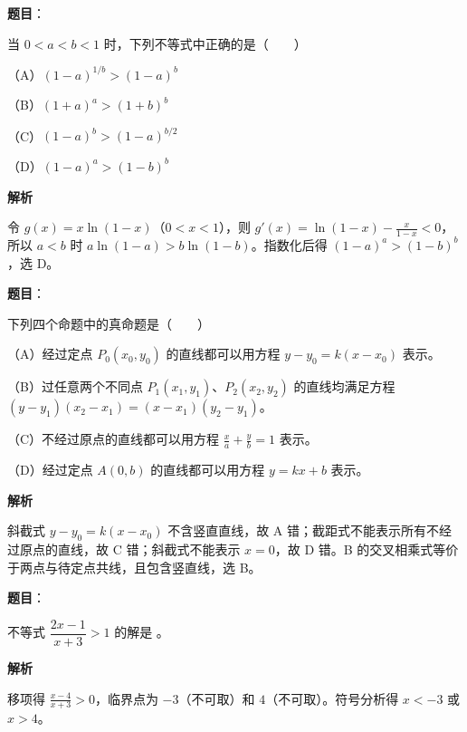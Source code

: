 \begin{answer}

\textbf{题目}：

当 $0<a<b<1$ 时，下列不等式中正确的是\mbox{（　　）}

（A）$(1-a)^{1/b}>(1-a)^b$

（B）$(1+a)^a>(1+b)^b$

（C）$(1-a)^b>(1-a)^{b/2}$

（D）$(1-a)^a>(1-b)^b$

\textbf{解析}

令 $g(x)=x\ln(1-x)$（$0<x<1$），则 $g'(x)=\ln(1-x)-\frac{x}{1-x}<0$，所以 $a<b$ 时 $a\ln(1-a)>b\ln(1-b)$。指数化后得 $(1-a)^a>(1-b)^b$，选 D。


\end{answer}
\begin{answer}

\textbf{题目}：

下列四个命题中的真命题是\mbox{（　　）}

（A）经过定点 $P_0(x_0,y_0)$ 的直线都可以用方程 $y-y_0=k(x-x_0)$ 表示。

（B）过任意两个不同点 $P_1(x_1,y_1)$、$P_2(x_2,y_2)$ 的直线均满足方程 $(y-y_1)(x_2-x_1)=(x-x_1)(y_2-y_1)$。

（C）不经过原点的直线都可以用方程 $\frac xa+\frac yb=1$ 表示。

（D）经过定点 $A(0,b)$ 的直线都可以用方程 $y=kx+b$ 表示。

\textbf{解析}

斜截式 $y-y_0=k(x-x_0)$ 不含竖直直线，故 A 错；截距式不能表示所有不经过原点的直线，故 C 错；斜截式不能表示 $x=0$，故 D 错。B 的交叉相乘式等价于两点与待定点共线，且包含竖直线，选 B。


\end{answer}
\begin{answer}

\textbf{题目}：

不等式 $\dfrac{2x-1}{x+3}>1$ 的解是 \gkblank{}。

\textbf{解析}

移项得 $\frac{x-4}{x+3}>0$，临界点为 $-3$（不可取）和 $4$（不可取）。符号分析得 $x<-3$ 或 $x>4$。


\end{answer}
